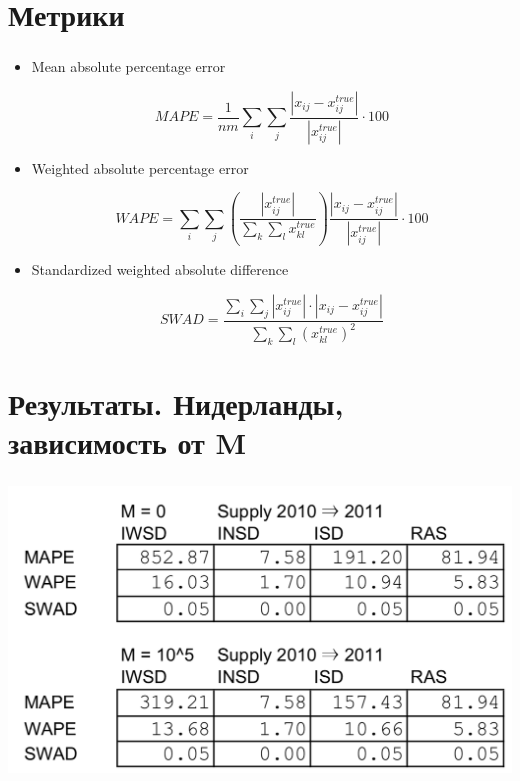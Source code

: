 \documentclass{beamer}
\begin{document}
\section{Метрики}
\begin{frame}
	\frametitle{\insertsection}
	
	\begin{itemize}
	    \item Mean absolute percentage error
	    
	    $$MAPE = \frac{1}{nm}\sum_i\sum_j\frac{|x_{ij} - x_{ij}^{true}|}{|x_{ij}^{true}|} \cdot 100$$
	    
	    \item Weighted absolute percentage error
	    
	    $$WAPE = \sum_i\sum_j\left( \frac{|x_{ij}^{true}|}{\sum_k \sum_l x_{kl}^{true}}\right) \frac{|x_{ij} - x_{ij}^{true}|}{|x_{ij}^{true}|}\cdot100$$
	    
	    \item Standardized weighted absolute difference
	    
	    $$SWAD = \frac{\sum_i \sum_j |x_{ij}^{true}| \cdot |x_{ij} - x_{ij}^{true}|}{\sum_k \sum_l\left( x_{kl}^{true} \right)^2}$$
	    
	\end{itemize}
	
\end{frame}

\section{Результаты. Нидерланды, зависимость от M}
\begin{frame}
	\frametitle{\insertsection}
	
	\includegraphics[width=\textwidth]{2019-12-12_05-45-48.png}
	
\end{frame}
\end{document}
